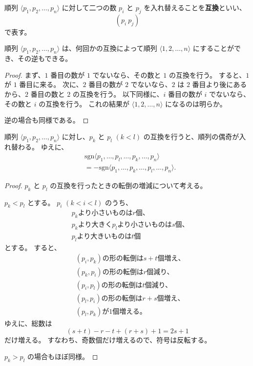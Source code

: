 \begin{dfn}[互換]
  順列 \(\langle p_1,p_2,\ldots,p_n\rangle\) に対して二つの数 \(p_i\) と \(p_j\) を入れ替えることを\textbf{互換}といい、
  \[(p_i\ p_j)\]
  で表す。
\end{dfn}

\begin{thm}\label{251218113701}
  順列 \(\langle p_1,p_2,\ldots,p_n\rangle\) は、何回かの互換によって順列 \(\langle 1,2,\ldots,n\rangle\) にすることができ、その逆もできる。
\end{thm}

\begin{proof}
  まず、\(1\) 番目の数が \(1\) でないなら、その数と \(1\) の互換を行う。
  すると、\(1\) が \(1\) 番目に来る。
  次に、\(2\) 番目の数が \(2\) でないなら、\(2\) は \(2\) 番目より後にあるから、\(2\) 番目の数と \(2\) の互換を行う。
  以下同様に、\(i\) 番目の数が \(i\) でないなら、その数と \(i\) の互換を行う。
  これの結果が \(\langle 1,2,\ldots,n\rangle\) になるのは明らか。

  逆の場合も同様である。
\end{proof}

\begin{thm}\label{251218094101}
  順列 \(\langle p_1,p_2,\ldots,p_n\rangle\) に対し、\(p_k\) と \(p_l\) \((k<l)\) の互換を行うと、順列の偶奇が入れ替わる。
  ゆえに、
  \begin{align*}
    & \mathrm{sgn}\langle p_1,\ldots,p_l,\ldots,p_k,\ldots,p_n\rangle \\
    &=-\mathrm{sgn}\langle p_1,\ldots,p_k,\ldots,p_l,\ldots,p_n\rangle.
  \end{align*}
\end{thm}

\begin{proof}
  \(p_k\) と \(p_l\) の互換を行ったときの転倒の増減について考える。

  \(p_k<p_l\) とする。
  \(p_i\) \((k<i<l)\) のうち、
  \begin{align*}
    & p_k \text{より小さいものは} r \text{個、} \\
    & p_k \text{より大きく} p_l \text{より小さいものは} s \text{個、} \\
    & p_l \text{より大きいものは} t \text{個}
  \end{align*}
  とする。
  すると、
  \begin{align*}
    & (p_i,p_k) \text{の形の転倒は} s+t \text{個増え、} \\
    & (p_k,p_i) \text{の形の転倒は} r \text{個減り、} \\
    & (p_i,p_l) \text{の形の転倒は} t \text{個減り、} \\
    & (p_l,p_i) \text{の形の転倒は} r+s \text{個増え、} \\
    & (p_l,p_k) \text{が} 1 \text{個増える。}
  \end{align*}
  ゆえに、総数は
  \[(s+t)-r-t+(r+s)+1=2s+1\]
  だけ増える。
  すなわち、奇数個だけ増えるので、符号は反転する。

  \(p_k>p_l\) の場合もほぼ同様。
\end{proof}

